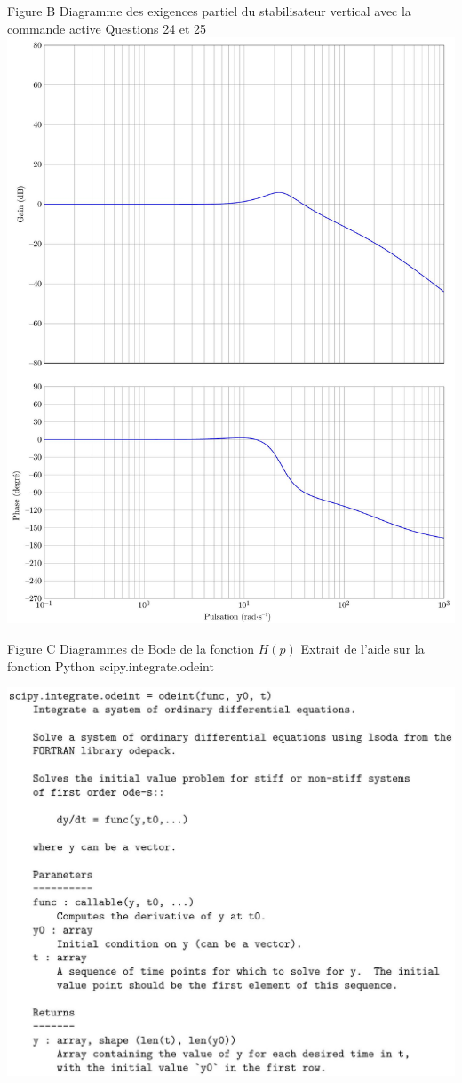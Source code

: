 \documentclass[10pt]{article}
\begin{document}
Figure B Diagramme des exigences partiel du stabilisateur vertical avec la commande active Questions 24 et 25
\includegraphics[max width=\textwidth, center]{2022_12_31_ed674c1a831ea1bff3a0g-14}

Figure C Diagrammes de Bode de la fonction $H(p)$ Extrait de l'aide sur la fonction Python scipy.integrate.odeint

\begin{center}
\includegraphics[max width=\textwidth]{2022_12_31_ed674c1a831ea1bff3a0g-15}
\end{center}
\end{document}
